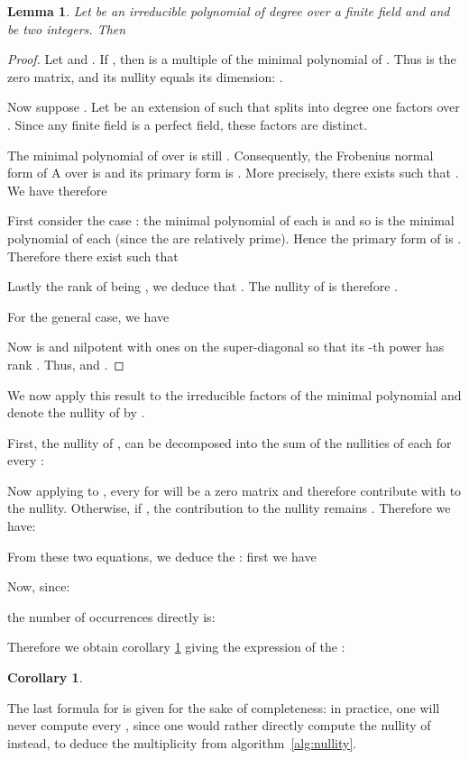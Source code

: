 \documentclass{article}
\newtheorem{lem}[thm]{Lemma}
\newtheorem{cor}[thm]{Corollary}
\begin{document}
\begin{lem}
Let  be an irreducible polynomial of degree  over a finite field 
and  and  be two integers. Then 

\end{lem}
\begin{proof}
Let  and . 
If , then  is a multiple of the minimal polynomial of
. Thus  is the zero matrix, and its nullity equals its dimension: .



Now suppose .
Let  be an extension of  such that  splits into
 degree one factors  over . Since any finite field is a perfect field, these factors are distinct.

The minimal polynomial of  over  is still . 
Consequently, the Frobenius normal form of A over
 is  and  
its primary form is . More precisely,
there exists  such that
.
We have therefore 

First consider the case : the minimal polynomial of each
 is  and so is the minimal polynomial of each
 (since the  are relatively prime). Hence the primary form
of  is . Therefore there
exist  such that 


Lastly the rank of  being , we deduce that
. The nullity of  is therefore .

For the general case, we have

Now  is  and nilpotent with ones on the super-diagonal
so that its -th power has rank .
Thus,  and .
\end{proof}
We now apply this result to the irreducible factors of the minimal polynomial
and denote the nullity of  by 
. 

First, the nullity of ,  can be decomposed
into the sum of the nullities of each  for every :

Now applying  to , every  for 
will be a zero matrix and therefore contribute with  to the
nullity. Otherwise, if , the contribution to the nullity
remains . Therefore we have:

From these two equations, we deduce the : first we have

Now, since:

the number of occurrences directly is:
 
Therefore we obtain corollary \ref{cor:occ} giving the expression of the :
\begin{cor}\label{cor:occ}

\end{cor}
The last formula for  is given for the sake of completeness: 
in practice, one will never compute every , since 
one would rather directly compute  the nullity of   instead, to
deduce the multiplicity  from algorithm~\ref{alg:nullity}.
\end{document}
